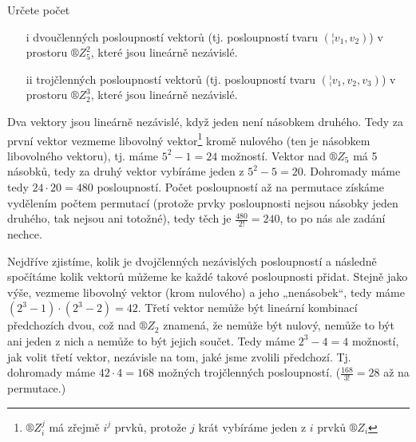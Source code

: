 \documentclass[12pt]{article}					%
\begin{document}
    \begin{priklad}[7.1]
        Určete počet
        \begin{itemize}
            \item[i] dvoučlenných posloupností vektorů (tj. posloupností tvaru $(¦v_1, v_2)$) v prostoru $®Z_5^2$, které jsou lineárně nezávislé.
            \item[ii] trojčlenných posloupností vektorů (tj. posloupností tvaru $(¦v_1, v_2, v_3)$) v prostoru $®Z_2^3$, které jsou lineárně nezávislé.
        \end{itemize}

        \begin{reseni}[i]
            Dva vektory jsou lineárně nezávislé, když jeden není násobkem druhého. Tedy za první vektor vezmeme libovolný vektor\footnote{$®Z_i^j$ má zřejmě $i^j$ prvků, protože $j$ krát vybíráme jeden z $i$ prvků $®Z_i$} kromě nulového (ten je násobkem libovolného vektoru), tj. máme $5^2 - 1 = 24$ možností. Vektor nad $®Z_5$ má 5 násobků, tedy za druhý vektor vybíráme jeden z $5^2 - 5 = 20$. Dohromady máme tedy $24·20 = 480$ posloupností. Počet posloupností až na permutace získáme vydělením počtem permutací (protože prvky posloupnosti nejsou násobky jeden druhého, tak nejsou ani totožné), tedy těch je $\frac{480}{2!} = 240$, to po nás ale zadání nechce.
        \end{reseni}

        \begin{reseni}
            Nejdříve zjistíme, kolik je dvojčlenných nezávislých posloupností a následně spočítáme kolik vektorů můžeme ke každé takové posloupnosti přidat. Stejně jako výše, vezmeme libovolný vektor (krom nulového) a jeho „nenásobek“, tedy máme $(2^3-1)·(2^3-2) = 42$. Třetí vektor nemůže být lineární kombinací předchozích dvou, což nad $®Z_2$ znamená, že nemůže být nulový, nemůže to být ani jeden z nich a nemůže to být jejich součet. Tedy máme $2^3 - 4 = 4$ možností, jak volit třetí vektor, nezávisle na tom, jaké jsme zvolili předchozí. Tj. dohromady máme $42·4 = 168$ možných trojčlenných posloupností. ($\frac{168}{3!} = 28$ až na permutace.)
        \end{reseni}
    \end{priklad}

\pagebreak
\end{document}
